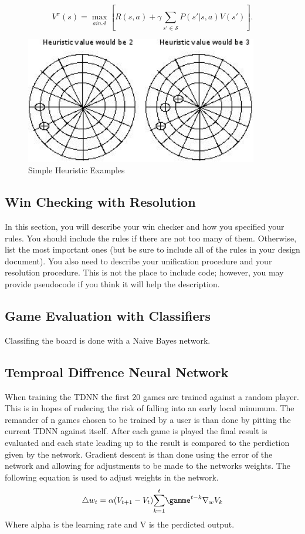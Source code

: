 \documentclass[12pt,letterpaper]{article}
\begin{document}
\[
V^\pi(s)=\max_{a in \mathcal{A}} \left[ R(s,a) + \gamma \sum_{s' \in \mathcal{S}} P(s'|s,a) V(s') \right].
\]

\begin{figure}
\begin{center}
\includegraphics[width=4in]{heu.png}
\end{center}
\caption{Simple Heuristic Examples}
\label{somefigure}
\end{figure}

\subsection{Win Checking with Resolution}
In this section, you will describe your win checker and how you specified your rules. 
You should include the rules if there are not too many of them. Otherwise, list the most important
ones (but be sure to include all of the rules in your design document). You also need to describe 
your unification procedure and your resolution procedure. This is not the place to include code; 
however, you may provide pseudocode if you think it will help the description.

\subsection{Game Evaluation with Classifiers}
Classifing the board is done with a Naive Bayes network. 

\subsection{Temproal Diffrence Neural Network}
When training the TDNN the first 20 games are trained against a random player. This is in hopes of rudecing the risk of falling into an early local minumum. The remander of n games chosen to be trained by a user is than done by pitting the current TDNN against itself. After each game is played the final result is evaluated and each state leading up to the result is compared to the perdiction given by the network. Gradient descent is than done using the error of the network and allowing for adjustments to be made to the networks weights. The following equation is used to adjust weights in the network. 
\[
{\triangle} w_t = \alpha (V _{t + 1} - V _t)  \overset{t}{\sum_{k = 1}} {\gamme}^{t - k} {\nabla}_w V_k
\]
Where alpha is the learning rate and V is the perdicted output.
\end{document}
